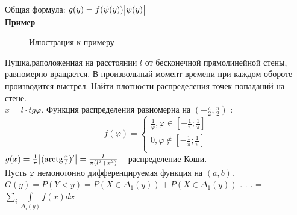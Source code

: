 \documentclass[russian, 12pt, fleqn,x11names]{article}
\begin{document}
\noindent
Общая формула: $g(y) = f(\psi(y)) \abs{\psi(y)}$\\
\textbf{Пример} \\
\begin{figure}[H]
\caption{Илюстрация к примеру}
\end{figure}
Пушка,раположенная на  расстоянии $l$ от бесконечной прямолинейной стены, равномерно вращается. В произвольный момент времени при каждом обороте производится выстрел. Найти плотности распределения точек попаданий  на стене.\\
$x = l \cdot tg \varphi$. Функция распределения равномерна на $(-\frac{\pi}{2},\frac{\pi}{2})$ : \\
\begin{equation*} 
f(\varphi)=
 \begin{cases}
   \frac{1}{\varphi},  \varphi \in [-\frac{1}{\pi};\frac{1}{\pi}]\\
   0 , \varphi \notin [-\frac{1}{\pi};\frac{1}{\pi}]\\
 \end{cases}
\end{equation*}
$g(x) = \frac{1}{\pi} \abs{( \textrm{arctg} \frac{x}{l})'} = \frac{l}{\pi(l^2 + x^2)}$ -- распределение Коши.\\
Пусть $\varphi$ немонотонно дифференцируемая функция на $(a, b)$.\\
$G(y) = P(Y<y) = P(X \in \Delta_1(y)) + P(X \in \Delta_1(y))$ . . . = $\displaystyle{\sum_{i}}  \displaystyle{\int\limits_{\Delta_i(y)} } f(x) dx$\\
\end{document}
